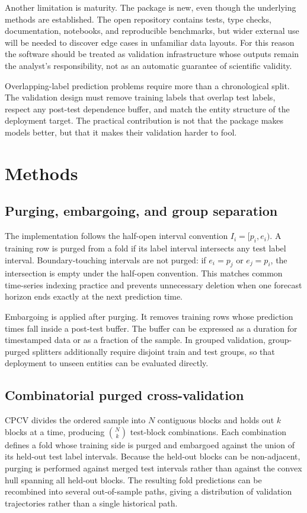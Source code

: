 \documentclass[10pt]{article}
\begin{document}
Another limitation is maturity. The package is new, even though the underlying
methods are established. The open repository contains tests, type checks,
documentation, notebooks, and reproducible benchmarks, but wider external use
will be needed to discover edge cases in unfamiliar data layouts. For this
reason the software should be treated as validation infrastructure whose outputs
remain the analyst's responsibility, not as an automatic guarantee of scientific
validity.

Overlapping-label prediction problems require more than a chronological split.
The validation design must remove training labels that overlap test labels,
respect any post-test dependence buffer, and match the entity structure of the
deployment target. The practical contribution is not that the package makes
models better, but that it makes their validation harder to fool.

\section{Methods}

\subsection{Purging, embargoing, and group separation}

The implementation follows the half-open interval convention $I_i = [p_i,e_i)$.
A training row is purged from a fold if its label interval intersects any test
label interval. Boundary-touching intervals are not purged: if $e_i=p_j$ or
$e_j=p_i$, the intersection is empty under the half-open convention. This
matches common time-series indexing practice and prevents unnecessary deletion
when one forecast horizon ends exactly at the next prediction time.

Embargoing is applied after purging. It removes training rows whose prediction
times fall inside a post-test buffer. The buffer can be expressed as a duration
for timestamped data or as a fraction of the sample. In grouped validation,
group-purged splitters additionally require disjoint train and test groups, so
that deployment to unseen entities can be evaluated directly.

\subsection{Combinatorial purged cross-validation}

CPCV divides the ordered sample into $N$ contiguous blocks and holds out $k$
blocks at a time, producing $\binom{N}{k}$ test-block combinations. Each
combination defines a fold whose training side is purged and embargoed against
the union of its held-out test label intervals. Because the held-out blocks can
be non-adjacent, purging is performed against merged test intervals rather than
against the convex hull spanning all held-out blocks. The resulting fold
predictions can be recombined into several out-of-sample paths, giving a
distribution of validation trajectories rather than a single historical path.
\end{document}
